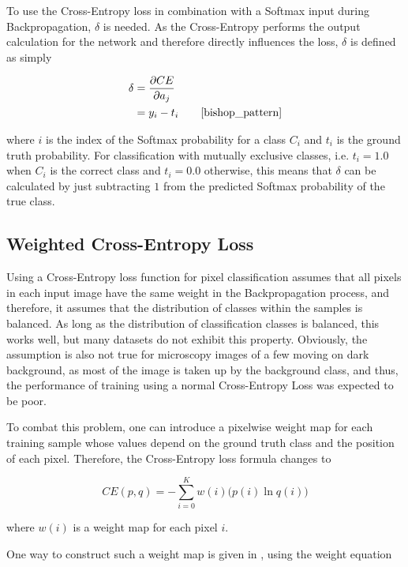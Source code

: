 \noindent To use the Cross-Entropy loss in combination with a Softmax input during Backpropagation, $\delta$ is needed. As the Cross-Entropy performs the output calculation for the network and therefore directly influences the loss, $\delta$ is defined as simply

\begin {align} \delta &= \frac{\partial CE}{\partial a_j}\\  
			    &= y_i - t_i \hspace{2em}\cite[\text{ p. 209}]{bishop_pattern}
\end {align}

\noindent where $i$ is the index of the Softmax probability for a class $C_i$ and $t_i$ is the ground truth probability. For classification with mutually exclusive classes, i.e. $t_i = 1.0$ when $C_i$ is the correct class and $t_i = 0.0$ otherwise, this means that $\delta$ can be calculated by just subtracting $1$ from the predicted Softmax probability of the true class.


		\subsection{Weighted Cross-Entropy Loss}

Using a Cross-Entropy loss function for pixel classification assumes that all pixels in each input image have the same weight in the Backpropagation process, and therefore, it assumes that the distribution of classes within the samples is balanced. As long as the distribution of classification classes is balanced, this works well, but many datasets do not exhibit this property. Obviously, the assumption is also not true for microscopy images of a few moving on dark background, as most of the image is taken up by the background class, and thus, the performance of training using a normal Cross-Entropy Loss was expected to be poor.

To combat this problem, one can introduce a pixelwise weight map for each training sample whose values depend on the ground truth class and the position of each pixel. Therefore, the Cross-Entropy loss formula changes to

\[ CE(p, q) = -\sum \limits_{i = 0}^{K} w(i) \bigg ( p(i) \ln q(i) \bigg ) \]

\noindent where $w(i)$ is a weight map for each pixel $i$.

One way to construct such a weight map is given in \cite{unet}, using the weight equation

